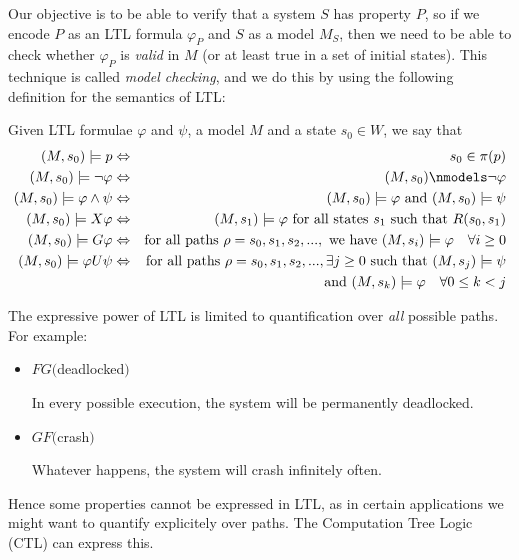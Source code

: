 \documentclass[11pt]{report}
\newenvironment{definition}[1][Definition]{\begin{trivlist}
\item[\hskip \labelsep {\bfseries #1}]}{\end{trivlist}}
\begin{document}
 Our objective is to be able to verify that a system $S$ has property $P$, so if we encode $P$ as an LTL formula $\varphi_P$ and $S$ as a model $M_S$, then we need to be able to check whether $\varphi_P$ is \textit{valid} in $M$ (or at least true in a set of initial states). This technique is called \textit{model checking}, and we do this by using the following definition for the semantics of LTL:
\label{model_checking}

\begin{definition}
Given LTL formulae $\varphi$ and $\psi$, a model $M$ and a state $s_0 \in W$, we say that
\begin{eqnarray*}
(M, s_0) \models p &\Leftrightarrow& s_0 \in \pi(p) \\  
(M, s_0) \models \lnot \varphi &\Leftrightarrow& (M, s_0) \nmodels \lnot \varphi\\
(M, s_0) \models \varphi \land \psi &\Leftrightarrow& (M, s_0) \models \varphi \mbox{ and  } (M, s_0) \models \psi \\
(M, s_0) \models X\varphi &\Leftrightarrow& (M, s_1) \models \varphi \mbox{  for all states } s_1 \mbox{ such that } R(s_0, s_1)\\
(M, s_0) \models G\varphi &\Leftrightarrow& \mbox{for all paths } \rho = s_0, s_1, s_2, ... , \mbox{ we have } (M, s_i) \models \varphi \quad \forall i \geq 0 \\
(M, s_0) \models \varphi U\psi &\Leftrightarrow& \mbox{for all paths } \rho = s_0, s_1, s_2, ..., \exists j \geq 0 \mbox{ such that }  (M, s_j) \models \psi \\ && \mbox{ and }  (M, s_k) \models \varphi \quad \forall 0 \leq k < j
\end{eqnarray*}

\end{definition}
The expressive power of LTL is limited to quantification over \textit{all} possible paths. For example: 

\begin{itemize}
\item $FG($deadlocked$)$ 

In every possible execution, the system will be permanently deadlocked.


\item $GF($crash$)$

Whatever happens, the system will crash infinitely often.
\end{itemize}
Hence some properties cannot be expressed in LTL, as in certain applications we might want to quantify explicitely over paths. The Computation Tree Logic (CTL) can express this. 
\end{document}
